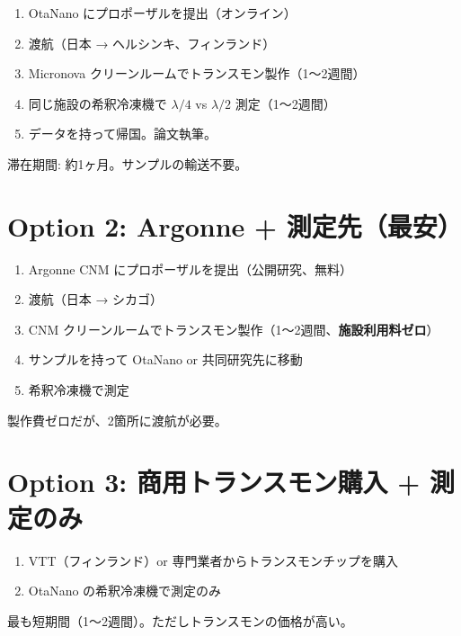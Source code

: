 \documentclass[12pt,a4paper]{article}
\begin{document}
\begin{stepbox}
\begin{enumerate}
\item OtaNano にプロポーザルを提出（オンライン）
\item 渡航（日本 → ヘルシンキ、フィンランド）
\item Micronova クリーンルームでトランスモン製作（1〜2週間）
\item 同じ施設の希釈冷凍機で $\lambda/4$ vs $\lambda/2$ 測定（1〜2週間）
\item データを持って帰国。論文執筆。
\end{enumerate}
滞在期間: 約1ヶ月。サンプルの輸送不要。
\end{stepbox}

\section{Option 2: Argonne + 測定先（最安）}

\begin{stepbox}
\begin{enumerate}
\item Argonne CNM にプロポーザルを提出（公開研究、無料）
\item 渡航（日本 → シカゴ）
\item CNM クリーンルームでトランスモン製作（1〜2週間、\textbf{施設利用料ゼロ}）
\item サンプルを持って OtaNano or 共同研究先に移動
\item 希釈冷凍機で測定
\end{enumerate}
製作費ゼロだが、2箇所に渡航が必要。
\end{stepbox}

\section{Option 3: 商用トランスモン購入 + 測定のみ}

\begin{stepbox}[製作をスキップ]
\begin{enumerate}
\item VTT（フィンランド）or 専門業者からトランスモンチップを購入
\item OtaNano の希釈冷凍機で測定のみ
\end{enumerate}
最も短期間（1〜2週間）。ただしトランスモンの価格が高い。
\end{stepbox}

\end{document}
